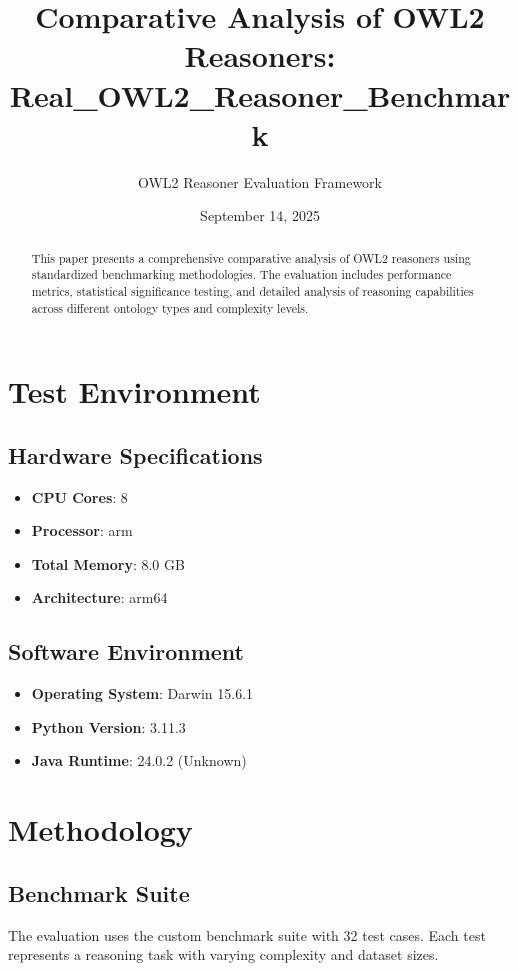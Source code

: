 \documentclass[11pt,a4paper]{{article}}
\title{{Comparative Analysis of OWL2 Reasoners: Real_OWL2_Reasoner_Benchmark}}
\author{{OWL2 Reasoner Evaluation Framework}}
\date{{September 14, 2025}}
\begin{document}
\maketitle

\begin{abstract}
This paper presents a comprehensive comparative analysis of OWL2 reasoners using standardized benchmarking methodologies. The evaluation includes performance metrics, statistical significance testing, and detailed analysis of reasoning capabilities across different ontology types and complexity levels.
\end{abstract}

\tableofcontents

\newpage

\section{Test Environment}

\subsection{Hardware Specifications}
\begin{itemize}
    \item \textbf{CPU Cores}: 8
    \item \textbf{Processor}: arm
    \item \textbf{Total Memory}: 8.0 GB
    \item \textbf{Architecture}: arm64
\end{itemize}

\subsection{Software Environment}
\begin{itemize}
    \item \textbf{Operating System}: Darwin 15.6.1
    \item \textbf{Python Version}: 3.11.3
    \item \textbf{Java Runtime}: 24.0.2 (Unknown)
\end{itemize}


\section{Methodology}

\subsection{Benchmark Suite}
The evaluation uses the custom benchmark suite with 32 test cases. Each test represents a reasoning task with varying complexity and dataset sizes.
\end{document}
